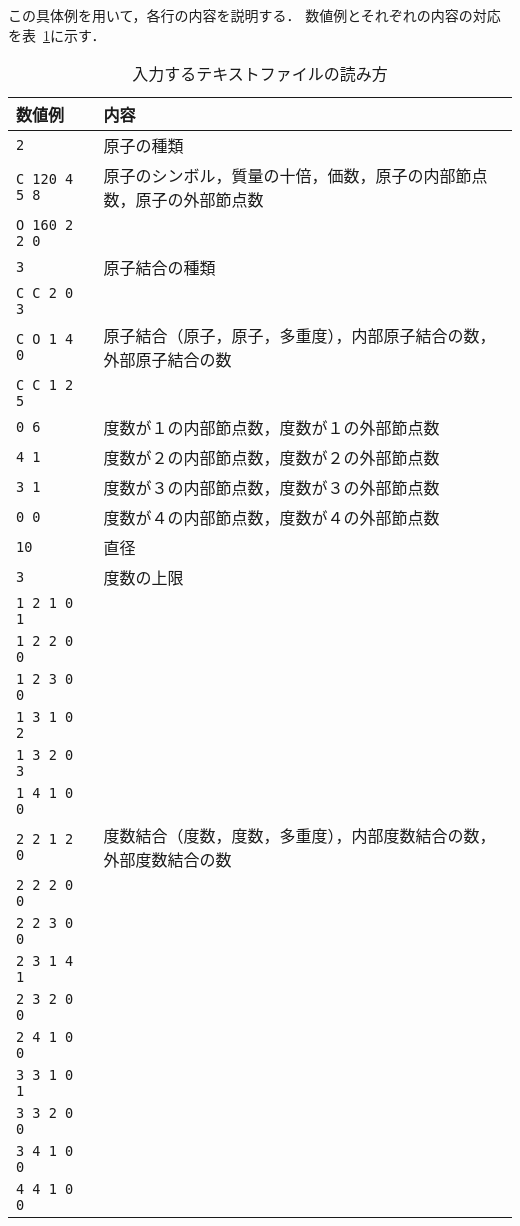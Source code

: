 \documentclass[11pt, titlepage, dvipdfmx, twoside]{article}
\begin{document}
この具体例を用いて，各行の内容を説明する．
数値例とそれぞれの内容の対応を表~\ref{tab:InputFormat}に示す．

\bigskip
\begin{table}[H]
\begin{center} \caption{入力するテキストファイルの読み方}
\label{tab:InputFormat}
  \begin{tabular}{l|l}
  数値例 & 内容\\ \hline \hline
{\tt  2} & 原子の種類\\ \hline
{\tt  C 120 4 5 8} & 原子のシンボル，質量の十倍，価数，原子の内部節点数，原子の外部節点数\\
{\tt  O 160 2 2 0} & \\ \hline
{\tt  3} & 原子結合の種類　\\ \hline
{\tt  C C 2 0 3} & \\
{\tt  C O 1 4 0} &  原子結合（原子，原子，多重度），内部原子結合の数，外部原子結合の数　\\
{\tt  C C 1 2 5} & \\ \hline
{\tt  0 6} & 度数が１の内部節点数，度数が１の外部節点数　\\ 
{\tt  4 1} & 度数が２の内部節点数，度数が２の外部節点数 \\
{\tt  3 1} & 度数が３の内部節点数，度数が３の外部節点数　\\
{\tt  0 0} & 度数が４の内部節点数，度数が４の外部節点数　\\ \hline
{\tt  10} & 直径　\\ \hline
{\tt  3} & 度数の上限　\\ \hline
{\tt  1 2 1 0 1} & \\
{\tt  1 2 2 0 0} & \\
{\tt  1 2 3 0 0} & \\
{\tt  1 3 1 0 2} & \\
{\tt  1 3 2 0 3} & \\
{\tt  1 4 1 0 0} & \\
{\tt  2 2 1 2 0} & 度数結合（度数，度数，多重度），内部度数結合の数，外部度数結合の数 \\
{\tt  2 2 2 0 0} & \\
{\tt  2 2 3 0 0} & \\
{\tt  2 3 1 4 1} & \\
{\tt  2 3 2 0 0} & \\
{\tt  2 4 1 0 0} & \\
{\tt  3 3 1 0 1} & \\
{\tt  3 3 2 0 0} & \\
{\tt  3 4 1 0 0} & \\
{\tt  4 4 1 0 0} & \\ \hline
  \end{tabular}
\end{center}
\end{table}
\end{document}
